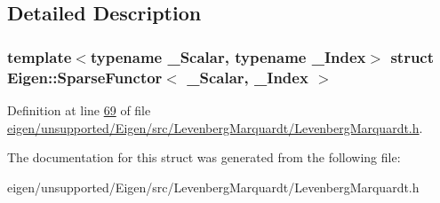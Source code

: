 \subsection{Detailed Description}
\subsubsection*{template$<$typename \+\_\+\+Scalar, typename \+\_\+\+Index$>$\newline
struct Eigen\+::\+Sparse\+Functor$<$ \+\_\+\+Scalar, \+\_\+\+Index $>$}



Definition at line \hyperlink{eigen_2unsupported_2_eigen_2src_2_levenberg_marquardt_2_levenberg_marquardt_8h_source_l00069}{69} of file \hyperlink{eigen_2unsupported_2_eigen_2src_2_levenberg_marquardt_2_levenberg_marquardt_8h_source}{eigen/unsupported/\+Eigen/src/\+Levenberg\+Marquardt/\+Levenberg\+Marquardt.\+h}.



The documentation for this struct was generated from the following file\+:\begin{DoxyCompactItemize}
\item 
eigen/unsupported/\+Eigen/src/\+Levenberg\+Marquardt/\+Levenberg\+Marquardt.\+h\end{DoxyCompactItemize}
